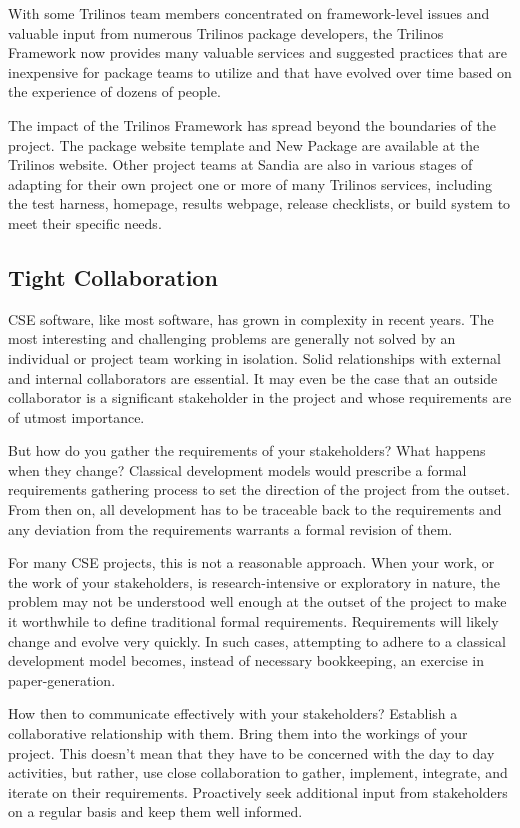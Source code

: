 \documentclass[12pt,relax]{article}
\begin{document}
  With some Trilinos team members concentrated on framework-level issues and
  valuable input from numerous Trilinos package developers, the Trilinos 
  Framework now provides many valuable services and suggested practices that
  are inexpensive for package teams to utilize and that have evolved over 
  time based on the experience of dozens of people.  

  The impact of the Trilinos Framework has spread beyond the boundaries of 
  the project.  The package website template and New Package are available 
  at the Trilinos website.  Other project teams at Sandia are also in various
  stages of adapting for their own project one or more of many Trilinos
  services, including the test harness, homepage, results webpage, 
  release checklists, or build system to meet their specific needs.
  
\subsection{Tight Collaboration}

CSE software, like most software, has grown in complexity in recent years.
The most interesting and challenging problems are generally not solved by an
individual or project team working in isolation.  Solid relationships with 
external and internal collaborators are essential.  It may even be the case
that an outside collaborator is a significant stakeholder in the project and 
whose requirements are of utmost importance.

But how do you gather the requirements of your stakeholders?  What happens
when they change?  Classical development models would prescribe a formal
requirements gathering process to set the direction of the project from the
outset.  From then on, all development has to be traceable back to the
requirements and any deviation from the requirements warrants a formal revision
of them.  

For many CSE projects, this is not a reasonable approach.  When your work, or 
the work of your stakeholders, is research-intensive or exploratory in nature, 
the problem may not be understood well enough at the outset of the project to 
make it worthwhile to define traditional formal requirements.  Requirements 
will likely change and evolve very quickly.  In such cases, attempting to
adhere to a classical development model becomes, instead of necessary
bookkeeping, an exercise in paper-generation.

How then to communicate effectively with your stakeholders?  Establish a
collaborative relationship with them.  Bring them into the workings of your
project.  This doesn't mean that they have to be concerned with the day to day
activities, but rather, use close collaboration to gather, implement,
integrate, and iterate on their requirements.  Proactively seek additional
input from stakeholders on a regular basis and keep them well informed.
\end{document}
